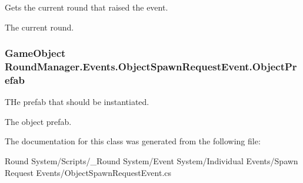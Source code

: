 Gets the current round that raised the event. 

The current round.\hypertarget{class_round_manager_1_1_events_1_1_object_spawn_request_event_a8a95244117fcfc697e4299c73dffea64}{}
\subsubsection[{Object\+Prefab}]{\setlength{\rightskip}{0pt plus 5cm}Game\+Object Round\+Manager.\+Events.\+Object\+Spawn\+Request\+Event.\+Object\+Prefab\hspace{0.3cm}{\ttfamily [get]}}\label{class_round_manager_1_1_events_1_1_object_spawn_request_event_a8a95244117fcfc697e4299c73dffea64}


T\+He prefab that should be instantiated. 

The object prefab.

The documentation for this class was generated from the following file\+:\begin{DoxyCompactItemize}
\item 
Round System/\+Scripts/\+\_\+\+Round System/\+Event System/\+Individual Events/\+Spawn Request Events/Object\+Spawn\+Request\+Event.\+cs\end{DoxyCompactItemize}
